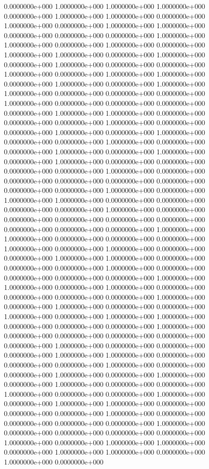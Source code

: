   0.0000000e+000  1.0000000e+000  1.0000000e+000  1.0000000e+000  0.0000000e+000
  1.0000000e+000  1.0000000e+000  0.0000000e+000  1.0000000e+000  0.0000000e+000
  1.0000000e+000  1.0000000e+000  0.0000000e+000  0.0000000e+000  0.0000000e+000
  1.0000000e+000  1.0000000e+000  0.0000000e+000  1.0000000e+000  0.0000000e+000
  1.0000000e+000  1.0000000e+000  0.0000000e+000  1.0000000e+000  0.0000000e+000
  1.0000000e+000  0.0000000e+000  0.0000000e+000  1.0000000e+000  0.0000000e+000
  1.0000000e+000  1.0000000e+000  0.0000000e+000  1.0000000e+000  0.0000000e+000
  1.0000000e+000  1.0000000e+000  0.0000000e+000  0.0000000e+000  0.0000000e+000
  1.0000000e+000  0.0000000e+000  0.0000000e+000  0.0000000e+000  0.0000000e+000
  1.0000000e+000  1.0000000e+000  0.0000000e+000  0.0000000e+000  0.0000000e+000
  1.0000000e+000  0.0000000e+000  0.0000000e+000  1.0000000e+000  0.0000000e+000
  1.0000000e+000  0.0000000e+000  0.0000000e+000  1.0000000e+000  0.0000000e+000
  0.0000000e+000  1.0000000e+000  0.0000000e+000  1.0000000e+000  0.0000000e+000
  1.0000000e+000  0.0000000e+000  0.0000000e+000  0.0000000e+000  0.0000000e+000
  1.0000000e+000  0.0000000e+000  0.0000000e+000  0.0000000e+000  0.0000000e+000
  0.0000000e+000  0.0000000e+000  0.0000000e+000  1.0000000e+000  0.0000000e+000
  1.0000000e+000  1.0000000e+000  0.0000000e+000  0.0000000e+000  0.0000000e+000
  0.0000000e+000  1.0000000e+000  0.0000000e+000  0.0000000e+000  0.0000000e+000
  0.0000000e+000  0.0000000e+000  0.0000000e+000  0.0000000e+000  0.0000000e+000
  1.0000000e+000  1.0000000e+000  0.0000000e+000  0.0000000e+000  0.0000000e+000
  1.0000000e+000  0.0000000e+000  1.0000000e+000  0.0000000e+000  0.0000000e+000
  1.0000000e+000  1.0000000e+000  0.0000000e+000  0.0000000e+000  0.0000000e+000
  1.0000000e+000  0.0000000e+000  0.0000000e+000  0.0000000e+000  0.0000000e+000
  1.0000000e+000  1.0000000e+000  0.0000000e+000  1.0000000e+000  0.0000000e+000
  0.0000000e+000  0.0000000e+000  0.0000000e+000  1.0000000e+000  0.0000000e+000
  1.0000000e+000  0.0000000e+000  0.0000000e+000  1.0000000e+000  0.0000000e+000
  1.0000000e+000  1.0000000e+000  0.0000000e+000  0.0000000e+000  0.0000000e+000
  1.0000000e+000  0.0000000e+000  0.0000000e+000  0.0000000e+000  0.0000000e+000
  0.0000000e+000  1.0000000e+000  0.0000000e+000  0.0000000e+000  0.0000000e+000
  1.0000000e+000  1.0000000e+000  0.0000000e+000  0.0000000e+000  0.0000000e+000
  1.0000000e+000  0.0000000e+000  0.0000000e+000  1.0000000e+000  0.0000000e+000
  1.0000000e+000  0.0000000e+000  1.0000000e+000  0.0000000e+000  0.0000000e+000
  1.0000000e+000  0.0000000e+000  0.0000000e+000  1.0000000e+000  0.0000000e+000
  1.0000000e+000  1.0000000e+000  0.0000000e+000  0.0000000e+000  0.0000000e+000
  1.0000000e+000  0.0000000e+000  0.0000000e+000  0.0000000e+000  0.0000000e+000
  1.0000000e+000  0.0000000e+000  0.0000000e+000  0.0000000e+000  0.0000000e+000
  1.0000000e+000  0.0000000e+000  1.0000000e+000  1.0000000e+000  0.0000000e+000
  1.0000000e+000  1.0000000e+000  0.0000000e+000  1.0000000e+000  0.0000000e+000
